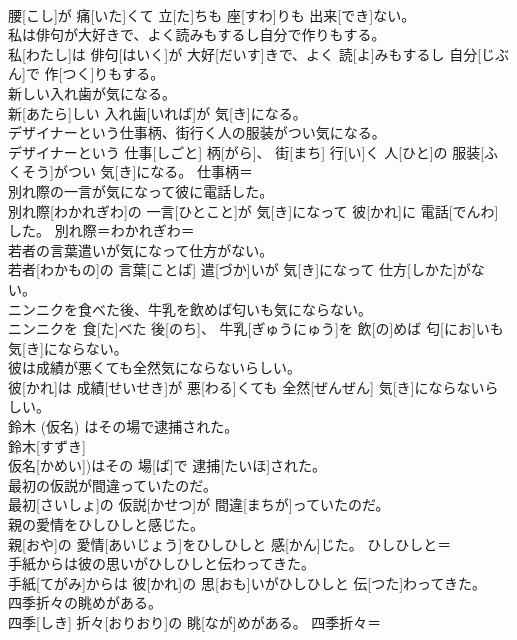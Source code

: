 \documentclass[8pt]{extreport}
\begin{document}
\begin{CJK}{UTF8}{min}
\\	腰[こし]が 痛[いた]くて 立[た]ちも 座[すわ]りも 出来[でき]ない。	
\\	私は俳句が大好きで、よく読みもするし自分で作りもする。	
\\	私[わたし]は 俳句[はいく]が 大好[だいす]きで、よく 読[よ]みもするし 自分[じぶん]で 作[つく]りもする。	
\\	新しい入れ歯が気になる。	
\\	新[あたら]しい 入れ歯[いれば]が 気[き]になる。	
\\	デザイナーという仕事柄、街行く人の服装がつい気になる。	
\\	デザイナーという 仕事[しごと] 柄[がら]、 街[まち] 行[い]く 人[ひと]の 服装[ふくそう]がつい 気[き]になる。	仕事柄＝ 
\\	別れ際の一言が気になって彼に電話した。	
\\	別れ際[わかれぎわ]の 一言[ひとこと]が 気[き]になって 彼[かれ]に 電話[でんわ]した。	別れ際＝わかれぎわ＝ 
\\	若者の言葉遣いが気になって仕方がない。	
\\	若者[わかもの]の 言葉[ことば] 遣[づか]いが 気[き]になって 仕方[しかた]がない。	
\\	ニンニクを食べた後、牛乳を飲めば匂いも気にならない。	
\\	ニンニクを 食[た]べた 後[のち]、 牛乳[ぎゅうにゅう]を 飲[の]めば 匂[にお]いも 気[き]にならない。	
\\	彼は成績が悪くても全然気にならないらしい。	
\\	彼[かれ]は 成績[せいせき]が 悪[わる]くても 全然[ぜんぜん] 気[き]にならないらしい。	
\\	鈴木 (仮名) はその場で逮捕された。	
\\	鈴木[すずき]
\\	仮名[かめい])はその 場[ば]で 逮捕[たいほ]された。	
\\	最初の仮説が間違っていたのだ。	
\\	最初[さいしょ]の 仮説[かせつ]が 間違[まちが]っていたのだ。	
\\	親の愛情をひしひしと感じた。	
\\	親[おや]の 愛情[あいじょう]をひしひしと 感[かん]じた。	ひしひしと＝ 
\\	手紙からは彼の思いがひしひしと伝わってきた。	
\\	手紙[てがみ]からは 彼[かれ]の 思[おも]いがひしひしと 伝[つた]わってきた。	
\\	四季折々の眺めがある。	
\\	四季[しき] 折々[おりおり]の 眺[なが]めがある。	四季折々＝ 

\end{CJK}
\end{document}
